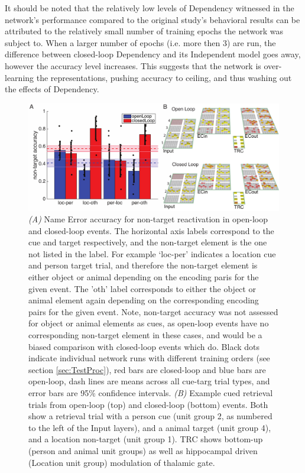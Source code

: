 \documentclass[11pt, titlepage, twoside]{article}
\begin{document}
It should be noted that the relatively low levels of Dependency witnessed in the network's performance compared to the original study's behavioral results %
can be attributed to the relatively small number of training epochs the network was subject to.  When a larger number of epochs (i.e. more then 3) are run, the difference between closed-loop Dependency and its Independent model goes away, however the accuracy level increases.  This suggests that the network is over-learning the representations, pushing accuracy to ceiling, and thus washing out the effects of Dependency.



\begin{figure}
    \begin{center}
	\includegraphics[width=\textwidth]{figs/depNonTarg_edit.pdf}
    \end{center}
      \caption[Non Target Reactivation]{
       \emph{(A)} Name Error accuracy for non-target reactivation in open-loop and closed-loop events.  The horizontal axis labels correspond to the cue and target respectively, and the non-target element is the one not listed in the label.  For example `loc-per' indicates a location cue and person target trial, and therefore the non-target element is either object or animal depending on the encoding paris for the given event.  The 'oth' label corresponds to either the object or animal element again depending on the corresponding encoding pairs for the given event.  Note, non-target accuracy was not assessed for object or animal elements as cues, as open-loop events have no corresponding non-target element in these cases, and would be a biased comparison with closed-loop events which do. Black dots indicate individual network runs with different training orders (see section \ref{sec:TestProc}), red bars are closed-loop and blue bars are open-loop, dash lines are means across all cue-targ trial types, and error bars are 95\% confidence intervals. \emph{(B)} Example cued retrieval trials from open-loop (top) and closed-loop (bottom) events.  Both show a retrieval trial with a person cue (unit group 2, as numbered to the left of the Input layers), and a animal target (unit group 4), and a location non-target (unit group 1).  TRC shows bottom-up (person and animal unit groups) as well as hippocampal driven (Location unit group) modulation of thalamic gate.
	}
     \label{fig:netNonTarg}
\end{figure}
\end{document}
